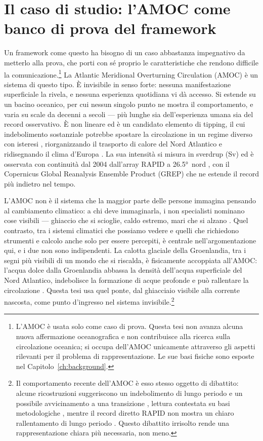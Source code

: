 \section{Il caso di studio: l'AMOC come banco di prova del framework}
\label{sec:case-study-amoc}

Un framework come questo ha bisogno di un caso abbastanza impegnativo da metterlo alla prova, che porti con sé proprio le caratteristiche che rendono difficile la comunicazione.\footnote{L'AMOC è usata solo come caso di prova. Questa tesi non avanza alcuna nuova affermazione oceanografica e non contribuisce alla ricerca sulla circolazione oceanica; si occupa dell'AMOC unicamente attraverso gli aspetti rilevanti per il problema di rappresentazione. Le sue basi fisiche sono esposte nel Capitolo~\ref{ch:background}.} La Atlantic Meridional Overturning Circulation (AMOC) è un sistema di questo tipo. È invisibile in senso forte: nessuna manifestazione superficiale la rivela, e nessuna esperienza quotidiana vi dà accesso. Si estende su un bacino oceanico, per cui nessun singolo punto ne mostra il comportamento, e varia su scale da decenni a secoli --- più lunghe sia dell'esperienza umana sia del record osservativo. È non lineare ed è un candidato elemento di tipping, il cui indebolimento sostanziale potrebbe spostare la circolazione in un regime diverso con isteresi \citep{armstrongmckay2022, lenton2008}, riorganizzando il trasporto di calore del Nord Atlantico e ridisegnando il clima d'Europa \citep{buckley2016}. La sua intensità si misura in sverdrup (Sv) ed è osservata con continuità dal 2004 dall'array RAPID a \ang{26.5}~nord \citep{frajkawilliams2021, moat2026}, con il Copernicus Global Reanalysis Ensemble Product (GREP) che ne estende il record più indietro nel tempo.

L'AMOC non è il sistema che la maggior parte delle persone immagina pensando al cambiamento climatico: a chi deve immaginarla, i non specialisti nominano cose visibili --- ghiaccio che si scioglie, caldo estremo, mari che si alzano \citep{oneill2014}. Quel contrasto, tra i sistemi climatici che possiamo vedere e quelli che richiedono strumenti e calcolo anche solo per essere percepiti, è centrale nell'argomentazione qui, e i due non sono indipendenti. La calotta glaciale della Groenlandia, tra i segni più visibili di un mondo che si riscalda, è fisicamente accoppiata all'AMOC: l'acqua dolce dalla Groenlandia abbassa la densità dell'acqua superficiale del Nord Atlantico, indebolisce la formazione di acque profonde e può rallentare la circolazione \citep{boning2016, caesar2018, rahmstorf2015}. Questa tesi usa quel ponte, dal ghiacciaio visibile alla corrente nascosta, come punto d'ingresso nel sistema invisibile.\footnote{Il comportamento recente dell'AMOC è esso stesso oggetto di dibattito: alcune ricostruzioni suggeriscono un indebolimento di lungo periodo e un possibile avvicinamento a una transizione \citep{caesar2018, boers2021, ditlevsen2023}, lettura contestata su basi metodologiche \citep{benyami2024}, mentre il record diretto RAPID non mostra un chiaro rallentamento di lungo periodo \citep{moat2026}. Questo dibattito irrisolto rende una rappresentazione chiara più necessaria, non meno.}

